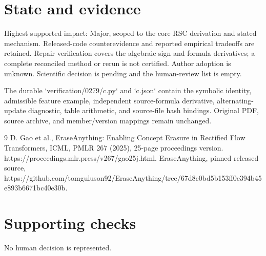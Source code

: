 \documentclass[10pt]{article}
\begin{document}
\section*{State and evidence}
Highest supported impact: Major, scoped to the core RSC derivation and stated mechanism. Released-code counterevidence and reported empirical tradeoffs are retained. Repair verification covers the algebraic sign and formula derivatives; a complete reconciled method or rerun is not certified. Author adoption is unknown. Scientific decision is pending and the human-review list is empty.\par
The durable `verification/0279/c.py` and `c.json` contain the symbolic identity, admissible feature example, independent source-formula derivative, alternating-update diagnostic, table arithmetic, and source-file hash bindings. Original PDF, source archive, and member/version mappings remain unchanged.\par
9 D. Gao et al., EraseAnything: Enabling Concept Erasure in Rectified Flow Transformers, ICML, PMLR 267 (2025), 25-page proceedings version. https://proceedings.mlr.press/v267/gao25j.html. EraseAnything, pinned released source, https://github.com/tomguluson92/EraseAnything/tree/67d8c0bd5b153ff0e394b45e893b6671bc40e30b.\par
\section*{Supporting checks}
No human decision is represented.\par
\end{document}
